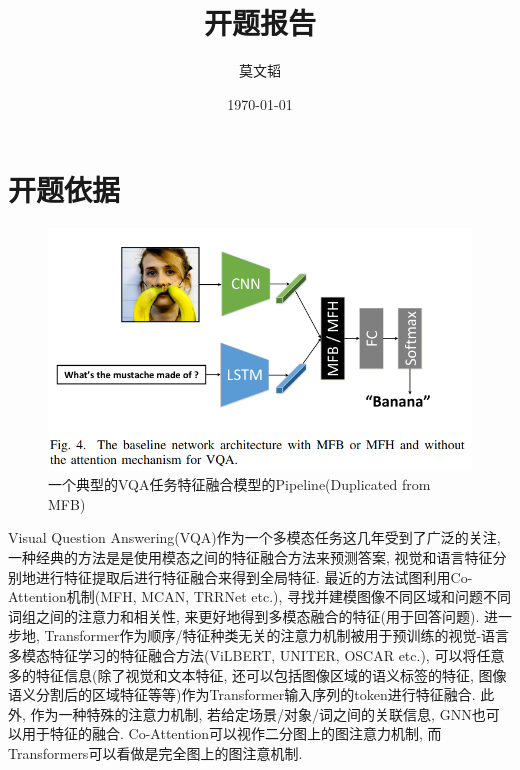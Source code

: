 \documentclass{article}
\title{\textbf{开题报告}}
\author{莫文韬}
\date{\today}
\begin{document}
\maketitle
\section*{ }
\label{contents}
\tableofcontents

\section{开题依据}


\begin{figure}[htbp]
    \caption{一个典型的VQA任务特征融合模型的Pipeline(Duplicated from MFB)}
    \centering
    \includegraphics[width=\textwidth]{vqa-arch.png}
\end{figure}

Visual Question Answering(VQA)作为一个多模态任务这几年受到了广泛的关注, 一种经典的方法是是使用模态之间的特征融合方法来预测答案, 视觉和语言特征分别地进行特征提取后进行特征融合来得到全局特征. 最近的方法试图利用Co-Attention机制(MFH, MCAN, TRRNet etc.), 寻找并建模图像不同区域和问题不同词组之间的注意力和相关性, 来更好地得到多模态融合的特征(用于回答问题). 进一步地, Transformer作为顺序/特征种类无关的注意力机制被用于预训练的视觉-语言多模态特征学习的特征融合方法(ViLBERT, UNITER, OSCAR etc.), 可以将任意多的特征信息(除了视觉和文本特征, 还可以包括图像区域的语义标签的特征, 图像语义分割后的区域特征等等)作为Transformer输入序列的token进行特征融合. 此外, 作为一种特殊的注意力机制, 若给定场景/对象/词之间的关联信息, GNN也可以用于特征的融合. Co-Attention可以视作二分图上的图注意力机制, 而Transformers可以看做是完全图上的图注意机制.
\end{document}
